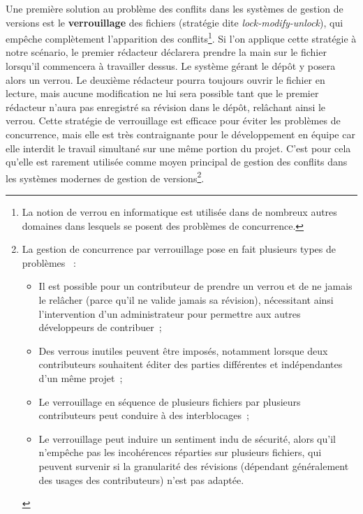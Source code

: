 Une première solution au problème des conflits dans les systèmes de
gestion de versions est le \textbf{verrouillage}
des fichiers (stratégie dite \textit{lock-modify-unlock}), qui empêche
complètement l'apparition des conflits\footnote{La notion de verrou en
  informatique est utilisée dans de nombreux autres domaines dans
  lesquels se posent des problèmes de concurrence.}. Si l'on applique
cette stratégie à notre scénario, le premier rédacteur déclarera
prendre la main sur le fichier lorsqu'il commencera à travailler
dessus. Le système gérant le dépôt y posera alors un verrou. Le
deuxième rédacteur pourra toujours ouvrir le fichier en lecture, mais
aucune modification ne lui sera possible tant que le premier rédacteur
n'aura pas enregistré sa révision dans le dépôt, relâchant ainsi le
verrou. Cette stratégie de verrouillage est efficace pour éviter les
problèmes de concurrence, mais elle est très contraignante pour le
développement en équipe car elle interdit le travail simultané sur une
même portion du projet. C'est pour cela qu'elle est rarement utilisée
comme moyen principal de gestion des conflits dans les systèmes
modernes de gestion de versions\footnote{La gestion de concurrence par
  verrouillage pose en fait plusieurs types de problèmes
  \cite[chap.~1]{SVNbook}~:
  \begin{itemize}
  \item Il est possible pour un contributeur de prendre un verrou et
    de ne jamais le relâcher (parce qu'il ne valide jamais sa
    révision), nécessitant ainsi l'intervention d'un administrateur
    pour permettre aux autres développeurs de contribuer~;
  \item Des verrous inutiles peuvent être imposés, notamment lorsque
    deux contributeurs souhaitent éditer des parties différentes et
    indépendantes d'un même projet~;
  \item Le verrouillage en séquence de plusieurs fichiers par
    plusieurs contributeurs peut conduire à des interblocages~;
  \item Le verrouillage peut induire un sentiment indu de sécurité,
    alors qu'il n'empêche pas les incohérences réparties sur plusieurs
    fichiers, qui peuvent survenir si la granularité des révisions
    (dépendant généralement des usages des contributeurs) n'est pas
    adaptée.
  \end{itemize}
}.

